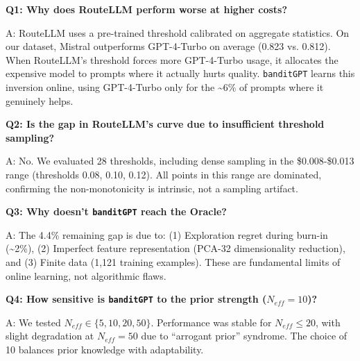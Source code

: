 \textbf{Q1: Why does RouteLLM perform worse at higher costs?}

A: RouteLLM uses a pre-trained threshold calibrated on aggregate statistics. On our dataset, Mistral outperforms GPT-4-Turbo on average (0.823 vs. 0.812). When RouteLLM's threshold forces more GPT-4-Turbo usage, it allocates the expensive model to prompts where it actually hurts quality. \texttt{banditGPT} learns this inversion online, using GPT-4-Turbo only for the \textasciitilde6\% of prompts where it genuinely helps.

\textbf{Q2: Is the gap in RouteLLM's curve due to insufficient threshold sampling?}

A: No. We evaluated 28 thresholds, including dense sampling in the \$0.008{-}\$0.013 range (thresholds 0.08, 0.10, 0.12). All points in this range are dominated, confirming the non-monotonicity is intrinsic, not a sampling artifact.

\textbf{Q3: Why doesn't \texttt{banditGPT} reach the Oracle?}

A: The 4.4\% remaining gap is due to: (1) Exploration regret during burn-in (\textasciitilde2\%), (2) Imperfect feature representation (PCA-32 dimensionality reduction), and (3) Finite data (1,121 training examples). These are fundamental limits of online learning, not algorithmic flaws.

\textbf{Q4: How sensitive is \texttt{banditGPT} to the prior strength ($N_{eff}=10$)?}

A: We tested $N_{eff} \in \{5, 10, 20, 50\}$. Performance was stable for $N_{eff} \leq 20$, with slight degradation at $N_{eff}=50$ due to ``arrogant prior'' syndrome. The choice of 10 balances prior knowledge with adaptability.



